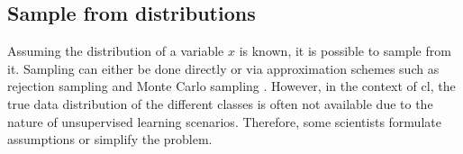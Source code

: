 
\subsection{Sample from distributions}
\label{subsec:SampleViaDistribution}

Assuming the distribution of a variable $x$ is known, it is possible to sample from it.
Sampling can either be done directly or 
via approximation schemes such as rejection sampling and Monte Carlo sampling \citet{robinson_contrastive_2021}.
However, in the context of \ac{cl}, the true data distribution of the different classes is often not available 
due to the nature of unsupervised learning scenarios.
Therefore, some scientists formulate assumptions or simplify the problem.








